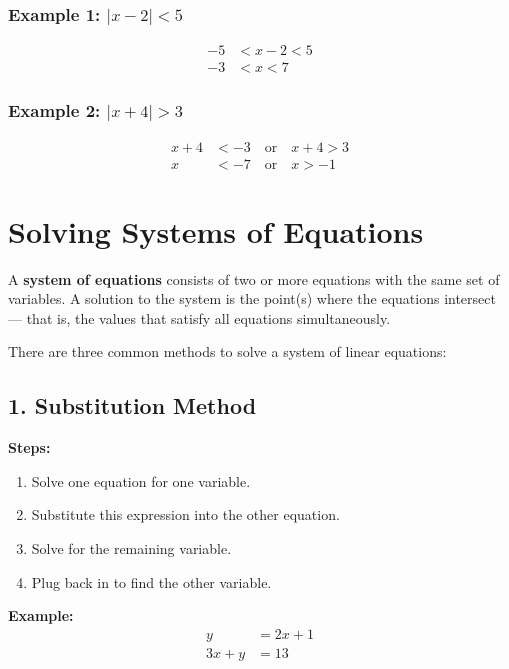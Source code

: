 \documentclass[11pt]{article}
\begin{document}
\subsubsection*{Example 1: \( |x - 2| < 5 \)}

\begin{align*}
-5 &< x - 2 < 5 \\
-3 &< x < 7
\end{align*}

\subsubsection*{Example 2: \( |x + 4| > 3 \)}

\begin{align*}
x + 4 &< -3 \quad \text{or} \quad x + 4 > 3 \\
x &< -7 \quad \text{or} \quad x > -1
\end{align*}

\section{Solving Systems of Equations}

A \textbf{system of equations} consists of two or more equations with the same set of variables. A solution to the system is the point(s) where the equations intersect — that is, the values that satisfy all equations simultaneously.

There are three common methods to solve a system of linear equations:

\subsection{1. Substitution Method}

\textbf{Steps:}
\begin{enumerate}
  \item Solve one equation for one variable.
  \item Substitute this expression into the other equation.
  \item Solve for the remaining variable.
  \item Plug back in to find the other variable.
\end{enumerate}

\textbf{Example:}
\[
\begin{aligned}
y &= 2x + 1 \\
3x + y &= 13
\end{aligned}
\]
\end{document}
